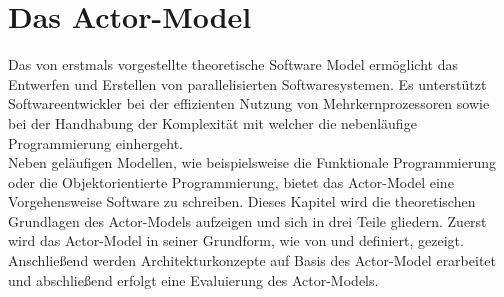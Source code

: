 \chapter{Das Actor-Model} \label{actor:chapter}
Das von \cite{hewitt1973session} erstmals vorgestellte theoretische Software Model ermöglicht das Entwerfen und Erstellen von parallelisierten Softwaresystemen. Es unterstützt Softwareentwickler bei der effizienten Nutzung von Mehrkernprozessoren sowie bei der Handhabung der  Komplexität mit welcher die nebenläufige Programmierung einhergeht.   
\\
Neben geläufigen Modellen, wie beispielsweise die Funktionale Programmierung oder die Objektorientierte Programmierung, bietet das Actor-Model eine Vorgehensweise Software zu schreiben. Dieses Kapitel wird die theoretischen Grundlagen des Actor-Models aufzeigen und sich in drei Teile gliedern. Zuerst wird das Actor-Model in seiner Grundform, wie von \cite{hewitt1973session} und \cite{Agha1985ActorsSystems} definiert, gezeigt. Anschließend werden Architekturkonzepte auf Basis des Actor-Model erarbeitet und abschließend erfolgt eine Evaluierung des Actor-Models.


